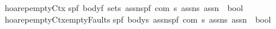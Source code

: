 \begin{isabellebody}
\isanewline
{\isachardoublequoteopen}{\isacharunderscore}hoarep{\isacharunderscore}emptyCtx{\isachardoublequoteclose}{\isacharcolon}{\isacharcolon}\isanewline
{\isachardoublequoteopen}{\isacharbrackleft}{\isacharparenleft}{\isacharprime}s{\isacharcomma}{\isacharprime}p{\isacharcomma}{\isacharprime}f{\isacharparenright}\ body{\isacharcomma}{\isacharprime}f\ set{\isacharcomma}{\isacharprime}s\ assn{\isacharcomma}{\isacharparenleft}{\isacharprime}s{\isacharcomma}{\isacharprime}p{\isacharcomma}{\isacharprime}f{\isacharparenright}\ com{\isacharcomma}\ {\isacharprime}s\ assn{\isacharcomma}{\isacharprime}s\ assn{\isacharbrackright}\ {\isacharequal}{\isachargreater}\ bool{\isachardoublequoteclose}\isanewline
\ \ \ {\isacharparenleft}{\isachardoublequoteopen}{\isacharparenleft}{}{\isacharunderscore}{\isacharslash}{\isacharbar}{\isacharminus}{\isacharprime}{\isacharslash}{\isacharunderscore}\ {\isacharparenleft}{\isacharunderscore}{\isacharslash}\ {\isacharparenleft}{\isacharunderscore}{\isacharparenright}{\isacharslash}\ {\isacharunderscore}{\isacharcomma}{\isacharslash}{\isacharunderscore}{\isacharparenright}{\isacharparenright}{\isachardoublequoteclose}\ {\isacharbrackleft}{}{}{\isacharcomma}{}{}{\isacharcomma}{}{}{}{}{\isacharcomma}{}{}{\isacharcomma}{}{}{}{}{\isacharcomma}{}{}{}{}{\isacharbrackright}{}{}{\isacharparenright}\isanewline
\isanewline
{\isachardoublequoteopen}{\isacharunderscore}hoarep{\isacharunderscore}emptyCtx{\isacharunderscore}emptyFaults{\isachardoublequoteclose}{\isacharcolon}{\isacharcolon}\isanewline
{\isachardoublequoteopen}{\isacharbrackleft}{\isacharparenleft}{\isacharprime}s{\isacharcomma}{\isacharprime}p{\isacharcomma}{\isacharprime}f{\isacharparenright}\ body{\isacharcomma}{\isacharprime}s\ assn{\isacharcomma}{\isacharparenleft}{\isacharprime}s{\isacharcomma}{\isacharprime}p{\isacharcomma}{\isacharprime}f{\isacharparenright}\ com{\isacharcomma}\ {\isacharprime}s\ assn{\isacharcomma}{\isacharprime}s\ assn{\isacharbrackright}\ {\isacharequal}{\isachargreater}\ bool{\isachardoublequoteclose}\isanewline
\ \ \ {\isacharparenleft}{\isachardoublequoteopen}{\isacharparenleft}{}{\isacharunderscore}{\isacharslash}{\isacharbar}{\isacharminus}{\isacharparenleft}{\isacharunderscore}{\isacharslash}\ {\isacharparenleft}{\isacharunderscore}{\isacharparenright}{\isacharslash}\ {\isacharunderscore}{\isacharcomma}{\isacharslash}{\isacharunderscore}{\isacharparenright}{\isacharparenright}{\isachardoublequoteclose}\ {\isacharbrackleft}{}{}{\isacharcomma}{}{}{}{}{\isacharcomma}{}{}{\isacharcomma}{}{}{}{}{\isacharcomma}{}{}{}{}{\isacharbrackright}{}{}{\isacharparenright}\isanewline

\end{isabellebody}
